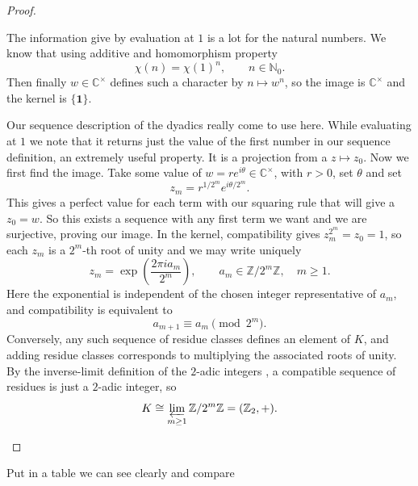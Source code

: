 \documentclass[11pt]{scrartcl}
\begin{document}
\begin{soln}
    \begin{proof}
        \begin{subproof}
			The information give by evaluation at $1$ is a lot for 
			the natural numbers. We know that using additive and homomorphism
			property
            \[
            \chi(n)=\chi(1)^n,
            \qquad n\in\mathbb N_0.
            \]
            Then finally $w\in\mathbb C^\times$ defines such a character
            by $n\mapsto w^n$, so the image is
            $\mathbb C^\times$ and the kernel is $\{\mathbf1\}$.
        \end{subproof}

        \begin{subproof}
			Our sequence description of the dyadics really come to use 
			here. While evaluating at $1$ we note that it returns just the value
			of the first number in our sequence definition, an extremely useful property. 
			It is a projection from a  $z\mapsto z_0$. Now 
			we first find the image. Take some value of $w=re^{i\theta}\in\mathbb C^\times$, with
            $r>0$, set $\theta$ and set
            \[
            z_m=r^{1/2^m}e^{i\theta/2^m}.
            \]
			This gives a perfect value for each term with our squaring rule 
			that will give a  $z_0=w$. So this exists a sequence with 
			any first term we want and we are surjective, proving our image. 
            In the kernel, compatibility gives
            $z_m^{2^m}=z_0=1$, so each $z_m$ is a $2^m$-th root of
            unity and we may write uniquely
            \[
            z_m=\exp\!\left(\frac{2\pi i a_m}{2^m}\right),
            \qquad
            a_m\in\mathbb Z/2^m\mathbb Z,\quad m\ge1.
            \]
            Here the exponential is independent of the chosen
            integer representative of $a_m$, and compatibility
            is equivalent to
            \[
            a_{m+1}\equiv a_m\pmod{2^m}.
            \]
            Conversely, any such sequence of residue classes
            defines an element of $K$, and adding residue classes
            corresponds to multiplying the associated roots of unity.
            By the inverse-limit definition of the $2$-adic
            integers \cite[Definitions~4.1 and~4.3]{p6-sutherland},
            a compatible sequence of residues is just a $2$-adic
            integer, so
            \[
            K\cong
            \varprojlim_{m\ge1}\mathbb Z/2^m\mathbb Z
            =(\mathbb Z_2,+).
            \]

        \end{subproof}
    \end{proof}

Put in a table we can see clearly and compare 

\end{soln}
\newpage
\end{document}
